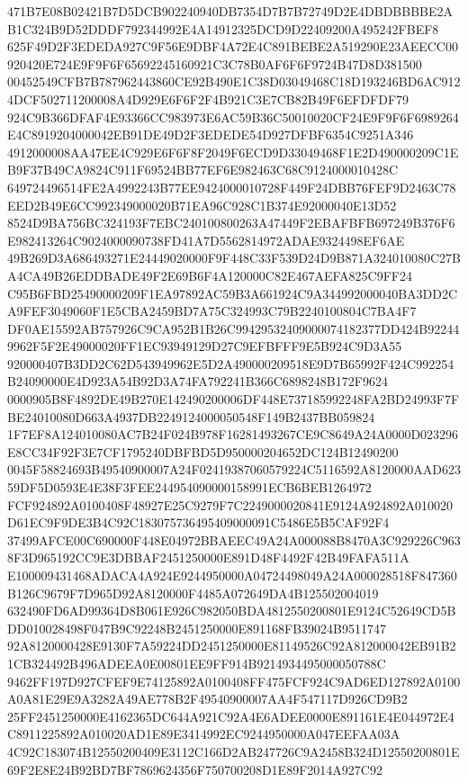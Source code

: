 \documentclass[UTF8,fontset=fandol,zihao=-4,a4paper]{ctexart}
\begin{document}
{{471B7E08B02421B7D5DCB902240940DB7354D7B7B72749D2E4DBDBBBBE2AB1C324B9D52DDDF792344992E4A14912325DCD9D22409200A495242FBEF8
625F49D2F3EDEDA927C9F56E9DBF4A72E4C891BEBE2A519290E23AEECC00920420E724E9F9F6F65692245160921C3C78B0AF6F6F9724B47D8D381500
00452549CFB7B787962443860CE92B490E1C38D03049468C18D193246BD6AC9124DCF502711200008A4D929E6F6F2F4B921C3E7CB82B49F6EFDFDF79
924C9B366DFAF4E93366CC983973E6AC59B36C50010020CF24E9F9F6F6989264E4C8919204000042EB91DE49D2F3EDEDE54D927DFBF6354C9251A346
4912000008AA47EE4C929E6F6F8F2049F6ECD9D33049468F1E2D490000209C1EB9F37B49CA9824C911F69524BB77EF6E982463C68C9124000010428C
649724496514FE2A4992243B77EE9424000010728F449F24DBB76FEF9D2463C78EED2B49E6CC992349000020B71EA96C928C1B374E92000040E13D52
8524D9BA756BC324193F7EBC240100800263A47449F2EBAFBFB697249B376F6E982413264C9024000090738FD41A7D5562814972ADAE9324498EF6AE
49B269D3A686493271E24449020000F9F448C33F539D24D9B871A324010080C27BA4CA49B26EDDBADE49F2E69B6F4A120000C82E467AEFA825C9FF24
C95B6FBD25490000209F1EA97892AC59B3A661924C9A344992000040BA3DD2CA9FEF3049060F1E5CBA2459BD7A75C324993C79B2240100804C7BA4F7
DF0AE15592AB757926C9CA952B1B26C99429532409000074182377DD424B922449962F5F2E49000020FF1EC93949129D27C9EFBFFF9E5B924C9D3A55
920000407B3DD2C62D543949962E5D2A490000209518E9D7B65992F424C992254B24090000E4D923A54B92D3A74FA792241B366C6898248B172F9624
0000905B8F4892DE49B270E142490200006DF448E737185992248FA2BD24993F7FBE24010080D663A4937DB2249124000050548F149B2437BB059824
1F7EF8A124010080AC7B24F024B978F16281493267CE9C8649A24A0000D023296E8CC34F92F3E7CF1795240DBFBD5D950000204652DC124B12490200
0045F58824693B49540900007A24F02419387060579224C5116592A8120000AAD62359DF5D0593E4E38F3FEE244954090000158991ECB6BEB1264972
FCF924892A0100408F48927E25C9279F7C2249000020841E9124A924892A010020D61EC9F9DE3B4C92C183075736495409000091C5486E5B5CAF92F4
37499AFCE00C690000F448E04972BBAEEC49A24A000088B8470A3C929226C9638F3D965192CC9E3DBBAF2451250000E891D48F4492F42B49FAFA511A
E100009431468ADACA4A924E9244950000A04724498049A24A000028518F847360B126C9679F7D965D92A8120000F4485A072649DA4B125502004019
632490FD6AD99364D8B061E926C982050BDA4812550200801E9124C52649CD5BDD010028498F047B9C92248B2451250000E891168FB39024B9511747
92A8120000428E9130F7A59224DD2451250000E81149526C92A812000042EB91B21CB324492B496ADEEA0E00801EE9FF914B9214934495000050788C
9462FF197D927CFEF9E74125892A0100408FF475FCF924C9AD6ED127892A0100A0A81E29E9A3282A49AE778B2F49540900007AA4F547117D926CD9B2
25FF2451250000E4162365DC644A921C92A4E6ADEE0000E891161E4E044972E4C8911225892A010020AD1E89E3414992EC9244950000A047EEFAA03A
4C92C183074B12550200409E3112C166D2AB247726C9A2458B324D12550200801E69F2E8E24B92BD7BF7869624356F750700208D1E89F2014A927C92
}}
\end{document}
